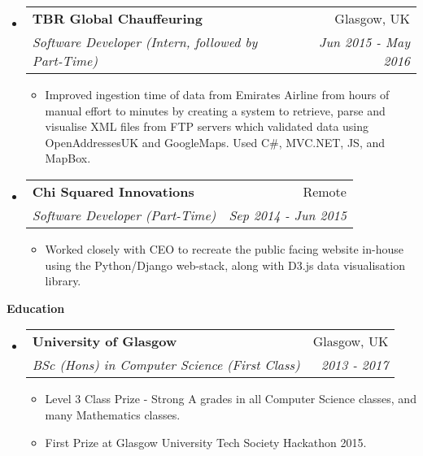 \documentclass[letterpaper,11pt]{article}
\makeatletter
\newcommand{\resitem}[1]{\item #1 \vspace{-2pt}}
\newcommand{\resheading}[1]{{\large \colorbox{mygrey}{\begin{minipage}{\textwidth}{\textbf{#1 \vphantom{p\^{E}}}}\end{minipage}}}}
\newcommand{\ressubheading}[4]{
\begin{tabular*}{7.0in}{l@{\extracolsep{\fill}}r}
	\textbf{#1} & #2 \\
	\textit{#3} & \textit{#4} \\
\end{tabular*}\vspace{-6pt}}
\makeatother
\begin{document}
\begin{itemize}
		\item
		\ressubheading{TBR Global Chauffeuring}{Glasgow, UK}{Software Developer (Intern, followed by Part-Time)}{Jun 2015 - May 2016}
		\begin{itemize}
			\resitem{Improved ingestion time of data from Emirates Airline from hours of manual effort to minutes by creating a system to retrieve, parse and visualise XML files from FTP servers which validated data using OpenAddressesUK and GoogleMaps. Used C\#, MVC.NET, JS, and MapBox.}
		\end{itemize}

		\item
		\ressubheading{Chi Squared Innovations}{Remote}{Software Developer (Part-Time)}{Sep 2014 - Jun 2015}
		\begin{itemize}
			\resitem {Worked closely with CEO to recreate the public facing website in-house using the Python/Django web-stack, along with D3.js data visualisation library.}
		\end{itemize}

	\end{itemize}

	\resheading{Education}
	\begin{itemize}
		\item
		\ressubheading{University of Glasgow}{Glasgow, UK}{BSc (Hons) in Computer Science (First Class)}{2013 - 2017}
		\begin{itemize}
			\resitem{Level 3 Class Prize - Strong A grades in all Computer Science classes, and many Mathematics classes.}
			\resitem{First Prize at Glasgow University Tech Society Hackathon 2015.}
		\end{itemize}
	\end{itemize}
\end{document}

